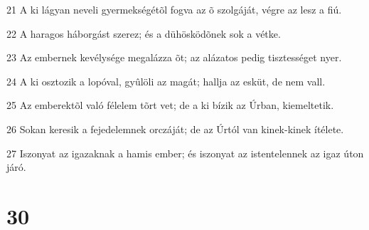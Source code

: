\par 21 A ki lágyan neveli gyermekségétõl fogva az õ szolgáját, végre az lesz a fiú.
\par 22 A haragos háborgást szerez; és a dühösködõnek sok a vétke.
\par 23 Az embernek kevélysége megalázza õt; az alázatos pedig  tisztességet nyer.
\par 24 A ki osztozik a lopóval, gyûlöli az magát; hallja az esküt, de nem vall.
\par 25 Az emberektõl való félelem tõrt vet; de a ki bízik az Úrban, kiemeltetik.
\par 26 Sokan keresik a fejedelemnek orczáját; de az Úrtól van kinek-kinek ítélete.
\par 27 Iszonyat az igazaknak a hamis ember; és iszonyat az istentelennek az igaz úton járó.

\chapter{30}

